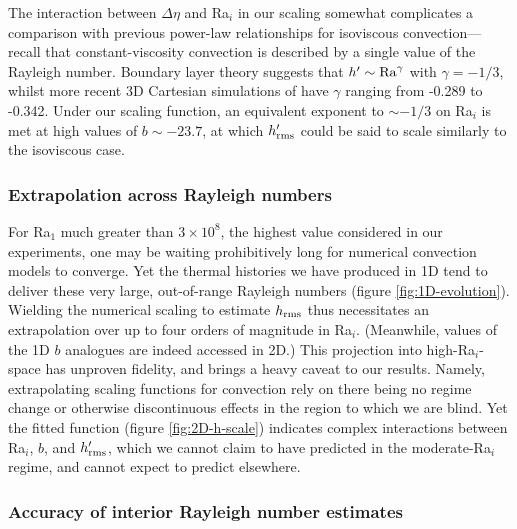 \documentclass[trackchanges]{aastex63}
\begin{document}
The interaction between $\Delta \eta$ and Ra$_i$ in our scaling somewhat complicates a comparison with previous power-law relationships for isoviscous convection---recall that constant-viscosity convection is described by a single value of the Rayleigh number. Boundary layer theory suggests that $h^\prime \sim {\rm Ra}^\gamma$ \citep{mckenzie_convection_1974, parsons_relationship_1983} with $\gamma=-1/3$, whilst more recent 3D Cartesian simulations of \citet{lees_gravity_2020} have $\gamma$ ranging from -0.289 to -0.342. Under our scaling function, an equivalent exponent to $\sim -1/3$ on Ra$_i$ is met at high values of $b \sim -23.7$, at which $h_{\rm rms}^\prime$ could be said to scale similarly to the isoviscous case. 


\subsubsection{Extrapolation across Rayleigh numbers} \label{sec:discussion-extrap}

For Ra$_1$ much greater than $3 \times 10^8$, the highest value considered in our experiments, one may be waiting prohibitively long for numerical convection models to converge. Yet the thermal histories we have produced in 1D tend to deliver these very large, out-of-range Rayleigh numbers (figure \ref{fig:1D-evolution}). Wielding the numerical scaling to estimate $h_{\rm rms}$ thus necessitates an extrapolation over up to four orders of magnitude in Ra$_i$. (Meanwhile, values of the 1D $b$ analogues are indeed accessed in 2D.) This projection into high-Ra$_i$-space has unproven fidelity, and brings a heavy caveat to our results. Namely, extrapolating scaling functions for convection rely on there being no regime change or otherwise discontinuous effects in the region to which we are blind. Yet the fitted function (figure \ref{fig:2D-h-scale}) indicates complex interactions between Ra$_i$, $b$, and $h_{\rm rms}^\prime$, which we cannot claim to have predicted in the moderate-Ra$_i$ regime, and cannot expect to predict elsewhere.


\subsubsection{Accuracy of interior Rayleigh number estimates} \label{sec:discussion-Ra}
\end{document}
